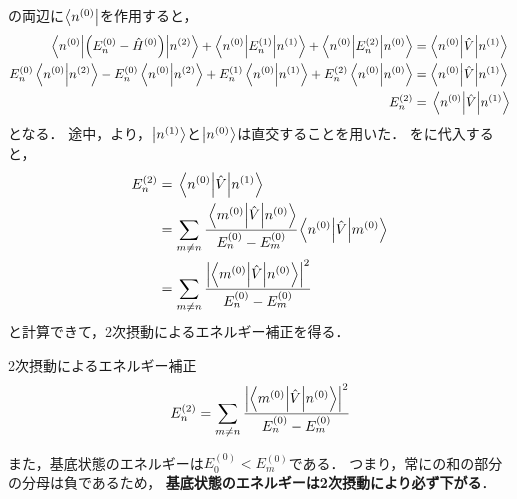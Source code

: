 \documentclass{report}
\begin{document}
  の両辺に$\bra{n^{(0)}}$を作用すると，
  \begin{align}
    \mel**{n^{(0)}}{\qty(E_n^{(0)} - \hat{H}^{(0)})}{n^{(2)}} + \mel**{n^{(0)}}{E_n^{(1)}}{n^{(1)}} + \mel**{n^{(0)}}{E_n^{(2)}}{n^{(0)}} &= \mel**{n^{(0)}}{\hat{V}}{n^{(1)}} \\ 
    E_n^{(0)}\braket{n^{(0)}}{n^{(2)}} - E_n^{(0)}\braket{n^{(0)}}{n^{(2)}} + E_n^{(1)}\braket{n^{(0)}}{n^{(1)}} + E_n^{(2)}\braket{n^{(0)}}{n^{(0)}} &= \mel**{n^{(0)}}{\hat{V}}{n^{(1)}}\\
    E_n^{(2)} &= \mel{n^{(0)}}{\hat{V}}{n^{(1)}}\label{2nd-order-tmp}
  \end{align}
  となる．
  途中，より，$\ket{n^{(1)}}$と$\ket{n^{(0)}}$は直交することを用いた．
  をに代入すると，
  \begin{align}
    E_n^{(2)} &= \mel{n^{(0)}}{\hat{V}}{n^{(1)}} \\ 
    &= \sum_{m\neq n}\cfrac{\mel**{m^{(0)}}{\hat{V}}{n^{(0)}}}{E_n^{(0)} - E_m^{(0)}}\mel{n^{(0)}}{\hat{V}}{m^{(0)}} \\ 
    &= \sum_{m\neq n}\cfrac{\abs{\mel**{m^{(0)}}{\hat{V}}{n^{(0)}}}^2}{E_n^{(0)} - E_m^{(0)}}
  \end{align}
  と計算できて，2次摂動によるエネルギー補正を得る．
  \begin{itembox}[l]{2次摂動によるエネルギー補正}
    \begin{align}
      E_n^{(2)} = \sum_{m\neq n}\cfrac{\abs{\mel**{m^{(0)}}{\hat{V}}{n^{(0)}}}^2}{E_n^{(0)} - E_m^{(0)}}\label{2nd-order-perturbation-eigenvalue}
    \end{align}
  \end{itembox}
  また，基底状態のエネルギーは$E_{0}^{(0)} < E_m^{(0)}$である．
  つまり，常にの和の部分の分母は負であるため，
  \textbf{基底状態のエネルギーは2次摂動により必ず下がる}．
\end{document}
